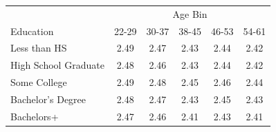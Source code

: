 \begin{tabular}{lccccc}
\hline\hline
 & \multicolumn{5}{c}{Age Bin} \\
Education & 22-29 & 30-37 & 38-45 & 46-53 & 54-61 \\
\hline
Less than HS&2.49&2.47&2.43&2.44&2.42\\
High School Graduate&2.48&2.46&2.43&2.44&2.42\\
Some College&2.49&2.48&2.45&2.46&2.44\\
Bachelor's Degree&2.48&2.47&2.43&2.45&2.43\\
Bachelors+&2.47&2.46&2.41&2.43&2.41\\
\hline\hline
\end{tabular}
